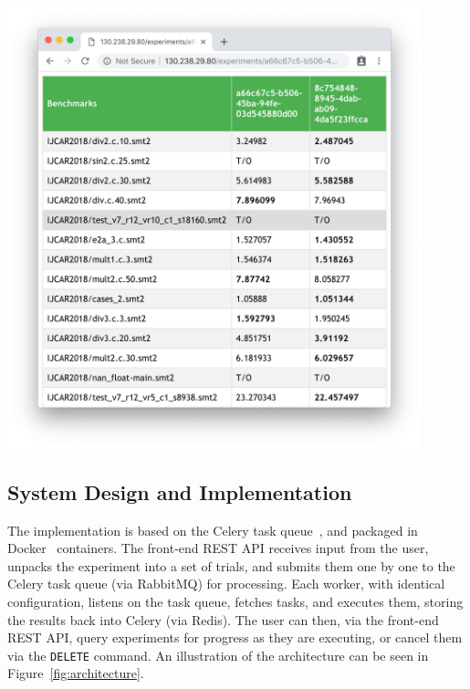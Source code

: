 \documentclass[a4paper]{IEEEtran}
\begin{document}
\vspace{1em}
\begin{Figure}
  \centering \includegraphics[width=0.9\textwidth]{table_view}
  \label{fig:table_view}
\end{Figure}
\vspace{1em}

\subsection{System Design and Implementation}
The implementation is based on the Celery task queue~\cite{celery}, and packaged
in Docker~\cite{docker} containers. The front-end REST API receives input from
the user, unpacks the experiment into a set of trials, and submits them one
by one to the Celery task queue (via RabbitMQ) for processing. Each worker, with
identical configuration, listens on the task queue, fetches tasks, and executes
them, storing the results back into Celery (via Redis). The user can then, via
the front-end REST API, query experiments for progress as they are executing, or
cancel them via the \texttt{DELETE} command. An illustration of the architecture
can be seen in Figure~\ref{fig:architecture}.
\end{document}
